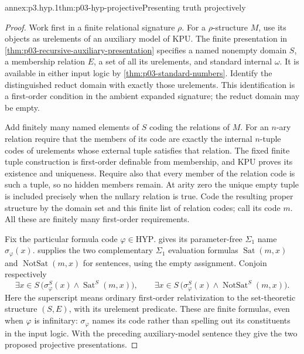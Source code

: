 \begin{annexitem}{annex:p3.hyp.1}{thm:p03-hyp-projective}{Presenting truth projectively}
\begin{proof}
Work first in a finite relational signature \(\rho\). For a
\(\rho\)-structure \(M\), use its objects as urelements of an
auxiliary model of KPU. The finite presentation in
\cref{thm:p03-recursive-auxiliary-presentation} specifies a named
nonempty domain \(S\), a membership relation \(E\), a set of all
its urelements, and standard internal \(\omega\). It is available
in either input logic by \cref{thm:p03-standard-numbers}.
Identify the distinguished reduct domain with exactly those
urelements. This identification is a first-order condition in the
ambient expanded signature; the reduct domain may be empty.

Add finitely many named elements of \(S\) coding the relations of
\(M\). For an \(n\)-ary relation require that the members of its
code are exactly the internal \(n\)-tuple codes of urelements whose
external tuple satisfies that relation. The fixed finite tuple
construction is first-order definable from membership, and KPU proves
its existence and uniqueness. Require also that every member of the
relation code is such a tuple, so no hidden members remain. At arity
zero the unique empty tuple is included precisely when the nullary
relation is true. Code the resulting proper structure by the domain
set and this finite list of relation codes; call its code \(m\).
All these are finitely many first-order requirements.

Fix the particular formula code \(\varphi\in\mathrm{HYP}\).
 gives its parameter-free
\(\Sigma_1\) name \(\sigma_\varphi(x)\).
 supplies the two complementary
\(\Sigma_1\) evaluation formulas
\(\operatorname{Sat}(m,x)\) and
\(\operatorname{NotSat}(m,x)\) for sentences, using the empty
assignment. Conjoin respectively
\[
 \exists x\in S\,
   \bigl(\sigma_\varphi^S(x)\land\operatorname{Sat}^S(m,x)\bigr),
 \qquad
 \exists x\in S\,
   \bigl(\sigma_\varphi^S(x)\land\operatorname{NotSat}^S(m,x)\bigr).
\]
Here the superscript means ordinary first-order relativization to the
set-theoretic structure \((S,E)\), with its urelement predicate.
These are finite formulas, even when \(\varphi\) is infinitary:
\(\sigma_\varphi\) names its code rather than spelling out its
constituents in the input logic. With the preceding auxiliary-model
sentence they give the two proposed projective presentations.


\end{proof}
\end{annexitem}
